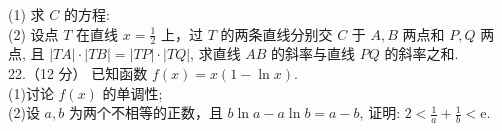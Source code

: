 \documentclass[UTF8]{ctexart}
\begin{document}
	(1) 求 $C$ 的方程:\\
	
	(2) 设点 $T$ 在直线 $x=\displaystyle{\frac{1}{2}}$ 上，过 $T$ 的两条直线分别交 $C$ 于 $A, B$ 两点和 $P, Q$ 两点,
	且 $|T A| \cdot|T B|=|T P| \cdot|T Q|$, 求直线 $A B$ 的斜率与直线 $P Q$ 的斜率之和.\\
	
	22.（12 分）
	已知函数 $f(x)=x(1-\ln x)$.\\
	
	(1)讨论 $f(x)$ 的单调性;\\
	
	(2)设 $a, b$ 为两个不相等的正数，且 $b \ln a-a \ln b=a-b$, 证明: $2<\displaystyle{\frac{1}{a}}+\displaystyle{\frac{1}{b}}<\mathrm{e} .$

	
\end{document}
